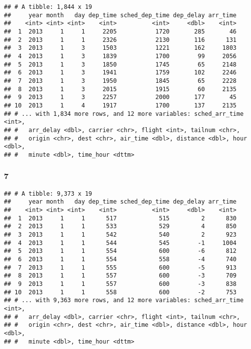 \documentclass[]{article}
\newenvironment{Shaded}{\begin{snugshade}}{\end{snugshade}}
\newcommand{\DecValTok}[1]{\textcolor[rgb]{0.00,0.00,0.81}{#1}}
\newcommand{\KeywordTok}[1]{\textcolor[rgb]{0.13,0.29,0.53}{\textbf{#1}}}
\newcommand{\NormalTok}[1]{#1}
\newcommand{\OperatorTok}[1]{\textcolor[rgb]{0.81,0.36,0.00}{\textbf{#1}}}
\newcommand{\StringTok}[1]{\textcolor[rgb]{0.31,0.60,0.02}{#1}}
\begin{document}
\begin{verbatim}
## # A tibble: 1,844 x 19
##     year month   day dep_time sched_dep_time dep_delay arr_time
##    <int> <int> <int>    <int>          <int>     <dbl>    <int>
##  1  2013     1     1     2205           1720       285       46
##  2  2013     1     1     2326           2130       116      131
##  3  2013     1     3     1503           1221       162     1803
##  4  2013     1     3     1839           1700        99     2056
##  5  2013     1     3     1850           1745        65     2148
##  6  2013     1     3     1941           1759       102     2246
##  7  2013     1     3     1950           1845        65     2228
##  8  2013     1     3     2015           1915        60     2135
##  9  2013     1     3     2257           2000       177       45
## 10  2013     1     4     1917           1700       137     2135
## # ... with 1,834 more rows, and 12 more variables: sched_arr_time <int>,
## #   arr_delay <dbl>, carrier <chr>, flight <int>, tailnum <chr>,
## #   origin <chr>, dest <chr>, air_time <dbl>, distance <dbl>, hour <dbl>,
## #   minute <dbl>, time_hour <dttm>
\end{verbatim}

\hypertarget{section-8}{%
\subsubsection{7}\label{section-8}}

\begin{Shaded}
\end{Shaded}

\begin{verbatim}
## # A tibble: 9,373 x 19
##     year month   day dep_time sched_dep_time dep_delay arr_time
##    <int> <int> <int>    <int>          <int>     <dbl>    <int>
##  1  2013     1     1      517            515         2      830
##  2  2013     1     1      533            529         4      850
##  3  2013     1     1      542            540         2      923
##  4  2013     1     1      544            545        -1     1004
##  5  2013     1     1      554            600        -6      812
##  6  2013     1     1      554            558        -4      740
##  7  2013     1     1      555            600        -5      913
##  8  2013     1     1      557            600        -3      709
##  9  2013     1     1      557            600        -3      838
## 10  2013     1     1      558            600        -2      753
## # ... with 9,363 more rows, and 12 more variables: sched_arr_time <int>,
## #   arr_delay <dbl>, carrier <chr>, flight <int>, tailnum <chr>,
## #   origin <chr>, dest <chr>, air_time <dbl>, distance <dbl>, hour <dbl>,
## #   minute <dbl>, time_hour <dttm>
\end{verbatim}
\end{document}
